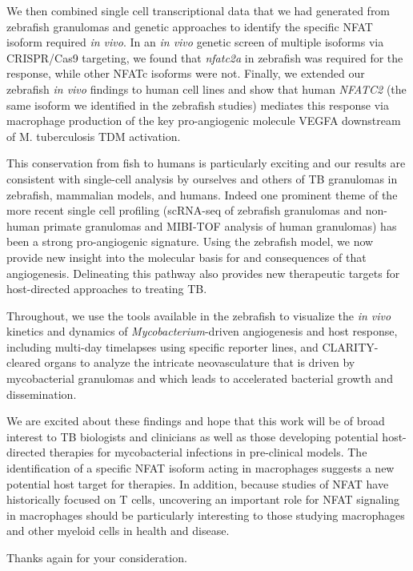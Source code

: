 We then combined single cell transcriptional data that we had generated from zebrafish granulomas and genetic approaches to identify the specific NFAT isoform required \textit{in vivo}. In an \textit{in vivo} genetic screen of multiple isoforms via CRISPR/Cas9 targeting, we found that \textit{nfatc2a} in zebrafish was required for the response, while other NFATc isoforms were not. Finally, we extended our zebrafish \textit{in vivo} findings to human cell lines and show that human \textit{NFATC2} (the same isoform we identified in the zebrafish studies) mediates this response via macrophage production of the key pro\hyp{}angiogenic molecule VEGFA downstream of M. tuberculosis TDM activation. 

This conservation from fish to humans is particularly exciting and our results are consistent with single\hyp{}cell analysis by ourselves and others of TB granulomas in zebrafish, mammalian models, and humans. Indeed one prominent theme of the more recent single cell profiling (scRNA\hyp{}seq of zebrafish granulomas and non\hyp{}human primate granulomas and MIBI\hyp{}TOF analysis of human granulomas) has been a strong pro\hyp{}angiogenic signature. Using the zebrafish model, we now provide new insight into the molecular basis for and consequences of that angiogenesis. Delineating this pathway also provides new therapeutic targets for host\hyp{}directed approaches to treating TB.

Throughout, we use the tools available in the zebrafish to visualize the \textit{in vivo} kinetics and dynamics of \textit{Mycobacterium}\hyp{}driven angiogenesis and host response, including multi\hyp{}day timelapses using specific reporter lines, and CLARITY\hyp{}cleared organs to analyze the intricate neovasculature that is driven by mycobacterial granulomas and which leads to accelerated bacterial growth and dissemination.

We are excited about these findings and hope that this work will be of broad interest to TB biologists and clinicians as well as those developing potential host\hyp{}directed therapies for mycobacterial infections in pre\hyp{}clinical models. The identification of a specific NFAT isoform acting in macrophages suggests a new potential host target for therapies. In addition, because studies of NFAT have historically focused on T cells, uncovering an important role for NFAT signaling in macrophages should be particularly interesting to those studying macrophages and other myeloid cells in health and disease.

Thanks again for your consideration.

